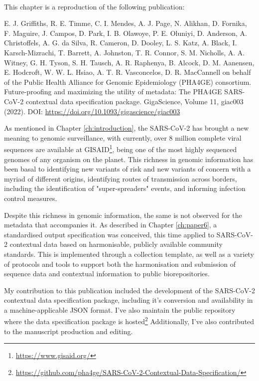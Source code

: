 \mbox{}\\
\vspace{8cm}

This chapter is a reproduction of the following publication:

E. J. Griffiths, R. E. Timme, C. I. Mendes, A. J. Page, N. Alikhan, D. Fornika, F. Maguire, J. Campos, D. Park, I. B. Olawoye, P. E. Oluniyi, D. Anderson, A. Christoffels, A. G. da Silva, R. Cameron, D. Dooley, L. S. Katz, A. Black, I. Karsch-Mizrachi, T. Barrett, A. Johnston, T. R. Connor, S. M. Nicholls, A. A. Witney, G. H. Tyson, S. H. Tausch, A. R. Raphenya, B. Alcock, D. M. Aanensen, E. Hodcroft, W. W. L. Hsiao, A. T. R. Vasconcelos, D. R. MacCannell on behalf of the Public Health Alliance for Genomic Epidemiology (PHA4GE) consortium.
Future-proofing and maximizing the utility of metadata: The PHA4GE SARS-CoV-2 contextual data specification package. GigaScience, Volume 11, giac003 (2022). DOI: \url{https://doi.org/10.1093/gigascience/giac003}

As mentioned in Chapter \ref{ch:introduction}, the \ac{SARS-CoV-2} has brought a new meaning to genomic surveillance, with currently, over 8 million complete viral sequences are available at GISAID\footnote{\url{https://www.gisaid.org/}}, being one of the most highly sequenced genomes of any organism on the planet. 
This richness in genomic information has been basal to identifying new variants of risk and new variants of concern with a myriad of different origins, identifying routes of transmission across borders, including the identification of "super-spreaders" events, and informing infection control measures. 

Despite this richness in genomic information, the same is not observed for the metadata that accompanies it. As described in Chapter \ref{ch:paper6}, a standardised output specification was conceived, this time applied to SARS-CoV-2 contextual data based on harmonisable, publicly available community standards. This is implemented through a collection template, as well as a variety of protocols and tools to support both the harmonisation and submission of sequence data and contextual information to public biorepositories.

My contribution to this publication included the development of the SARS-CoV-2 contextual data specification package, including it's conversion and availability in a machine-applicable JSON format. I've also maintain the public repository where the data specification package is hosted\footnote{\url{https://github.com/pha4ge/SARS-CoV-2-Contextual-Data-Specification/}} Additionally, I've also contributed to the manuscript production and editing.


